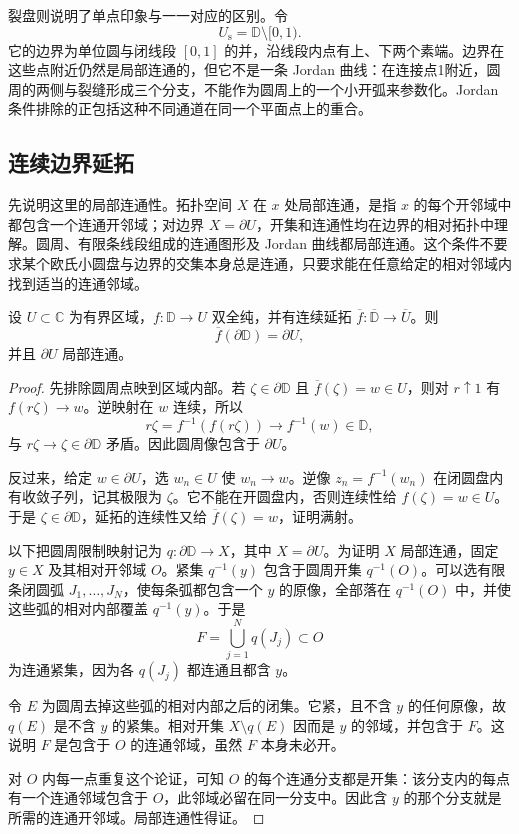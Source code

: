 裂盘则说明了单点印象与一一对应的区别。令
\[
 U_{\mathrm s}=\mathbb D\setminus[0,1).
\]
它的边界为单位圆与闭线段 \([0,1]\) 的并，沿线段内点有上、下两个素端。边界在这些点附近仍然是局部连通的，但它不是一条 Jordan 曲线：在连接点1附近，圆周的两侧与裂缝形成三个分支，不能作为圆周上的一个小开弧来参数化。Jordan 条件排除的正包括这种不同通道在同一个平面点上的重合。

\subsection{连续边界延拓}
\label{b3:subsec:070202}

先说明这里的局部连通性。拓扑空间 \(X\) 在 \(x\) 处局部连通，是指 \(x\) 的每个开邻域中都包含一个连通开邻域；对边界 \(X=\partial U\)，开集和连通性均在边界的相对拓扑中理解。圆周、有限条线段组成的连通图形及 Jordan 曲线都局部连通。这个条件不要求某个欧氏小圆盘与边界的交集本身总是连通，只要求能在任意给定的相对邻域内找到适当的连通邻域。

\begin{proposition}[连续延拓的边界像]\label{b3:prop:07-boundary-surjection}
设 \(U\subset\mathbb C\) 为有界区域，\(f:\mathbb D\to U\) 双全纯，并有连续延拓 \(\overline f:\overline{\mathbb D}\to\overline U\)。则
\[
 \overline f(\partial\mathbb D)=\partial U,
\]
并且 \(\partial U\) 局部连通。
\end{proposition}
\begin{proof}
先排除圆周点映到区域内部。若 \(\zeta\in\partial\mathbb D\) 且 \(\overline f(\zeta)=w\in U\)，则对 \(r\uparrow1\) 有 \(f(r\zeta)\to w\)。逆映射在 \(w\) 连续，所以
\[
 r\zeta=f^{-1}(f(r\zeta))\longrightarrow f^{-1}(w)\in\mathbb D,
\]
与 \(r\zeta\to\zeta\in\partial\mathbb D\) 矛盾。因此圆周像包含于 \(\partial U\)。

反过来，给定 \(w\in\partial U\)，选 \(w_n\in U\) 使 \(w_n\to w\)。逆像 \(z_n=f^{-1}(w_n)\) 在闭圆盘内有收敛子列，记其极限为 \(\zeta\)。它不能在开圆盘内，否则连续性给 \(f(\zeta)=w\in U\)。于是 \(\zeta\in\partial\mathbb D\)，延拓的连续性又给 \(\overline f(\zeta)=w\)，证明满射。

以下把圆周限制映射记为 \(q:\partial\mathbb D\to X\)，其中 \(X=\partial U\)。为证明 \(X\) 局部连通，固定 \(y\in X\) 及其相对开邻域 \(O\)。紧集 \(q^{-1}(y)\) 包含于圆周开集 \(q^{-1}(O)\)。可以选有限条闭圆弧 \(J_1,\ldots,J_N\)，使每条弧都包含一个 \(y\) 的原像，全部落在 \(q^{-1}(O)\) 中，并使这些弧的相对内部覆盖 \(q^{-1}(y)\)。于是
\[
 F=\bigcup_{j=1}^N q(J_j)\subset O
\]
为连通紧集，因为各 \(q(J_j)\) 都连通且都含 \(y\)。

令 \(E\) 为圆周去掉这些弧的相对内部之后的闭集。它紧，且不含 \(y\) 的任何原像，故 \(q(E)\) 是不含 \(y\) 的紧集。相对开集 \(X\setminus q(E)\) 因而是 \(y\) 的邻域，并包含于 \(F\)。这说明 \(F\) 是包含于 \(O\) 的连通邻域，虽然 \(F\) 本身未必开。

对 \(O\) 内每一点重复这个论证，可知 \(O\) 的每个连通分支都是开集：该分支内的每点有一个连通邻域包含于 \(O\)，此邻域必留在同一分支中。因此含 \(y\) 的那个分支就是所需的连通开邻域。局部连通性得证。
\end{proof}

